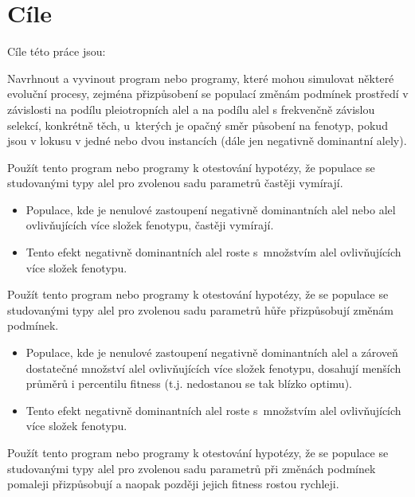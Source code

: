 \chapter{Cíle}


Cíle této práce jsou:


\begin{enumerate}
    \item{Navrhnout a vyvinout program nebo programy, které mohou simulovat některé evoluční procesy, zejména přizpůsobení
    se populací změnám podmínek prostředí v závislosti na podílu pleiotropních alel a na podílu alel s frekvenčně
    závislou selekcí, konkrétně těch, u~kterých je opačný směr působení na fenotyp, pokud jsou v lokusu v jedné nebo
    dvou instancích (dále jen negativně dominantní alely).
    \item{Použít tento program nebo programy k otestování hypotézy, že populace se studovanými typy alel  pro zvolenou
         sadu parametrů častěji vymírají.}
        \begin{itemize}
            \item{Populace, kde je nenulové zastoupení negativně dominantních alel nebo alel ovlivňujících více
                  složek fenotypu, častěji vymírají.}
            \item{Tento efekt negativně dominantních alel roste s množstvím alel ovlivňujících více složek fenotypu.}
        \end{itemize}
    }
    \item{Použít tento program nebo programy k otestování hypotézy, že se populace se studovanými typy alel pro zvolenou
         sadu parametrů hůře přizpůsobují změnám podmínek.
        \begin{itemize}
            \item{Populace, kde je nenulové zastoupení negativně dominantních alel a zároveň dostatečné množství
                       alel ovlivňujících více složek fenotypu, dosahují menších průměrů i percentilu fitness (t.j.
                       nedostanou se tak blízko optimu).}
            \item{Tento efekt negativně dominantních alel roste s množstvím alel ovlivňujících více složek fenotypu.}
        \end{itemize}
    }
    \item{Použít tento program nebo programy k otestování hypotézy, že se populace se studovanými typy alel pro zvolenou
         sadu parametrů při změnách podmínek pomaleji přizpůsobují a naopak později jejich fitness rostou rychleji.

}
\end{enumerate}
